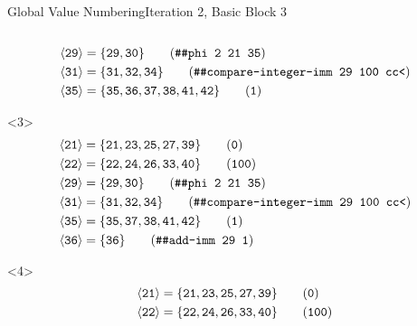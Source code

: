 \documentclass{beamer}
\newcommand{\vn}[1]{\ensuremath{\langle\texttt{#1}\rangle}}
\newcommand{\vreg}[1]{\texttt{#1}}
\begin{document}
\begin{frame}[fragile]{Global Value Numbering}{Iteration 2, Basic Block 3}
\begin{columns}[t,onlytextwidth]
\begin{column}{.5\textwidth}
\begin{onlyenv}
\begin{align*}
          \vn{29} &= \{\vreg{29},
                       \vreg{30}\} \tag{\texttt{\#\#phi 2 21 35}} \\
          \vn{31} &= \{\vreg{31},
                       \vreg{32},
                       \vreg{34}\} \tag{\texttt{\#\#compare-integer-imm 29 100 cc<}} \\
          \vn{35} &= \{\vreg{35},
                       \vreg{36},
                       \vreg{37},
                       \vreg{38},
                       \vreg{41},
                       \vreg{42}\} \tag{\texttt{1}}
        \end{align*}
      \end{onlyenv}
      \begin{onlyenv}<3>
        \begin{align*}
          \vn{21} &= \{\vreg{21},
                       \vreg{23},
                       \vreg{25},
                       \vreg{27},
                       \vreg{39}\} \tag{\texttt{0}} \\
          \vn{22} &= \{\vreg{22},
                       \vreg{24},
                       \vreg{26},
                       \vreg{33},
                       \vreg{40}\} \tag{\texttt{100}} \\
          \vn{29} &= \{\vreg{29},
                       \vreg{30}\} \tag{\texttt{\#\#phi 2 21 35}} \\
          \vn{31} &= \{\vreg{31},
                       \vreg{32},
                       \vreg{34}\} \tag{\texttt{\#\#compare-integer-imm 29 100 cc<}} \\
          \vn{35} &= \{\vreg{35},
                       \vreg{37},
                       \vreg{38},
                       \vreg{41},
                       \vreg{42}\} \tag{\texttt{1}} \\
          \vn{36} &= \{\vreg{36}\} \tag{\texttt{\#\#add-imm 29 1}}
        \end{align*}
      \end{onlyenv}
      \begin{onlyenv}<4>
        \begin{align*}
          \vn{21} &= \{\vreg{21},
                       \vreg{23},
                       \vreg{25},
                       \vreg{27},
                       \vreg{39}\} \tag{\texttt{0}} \\
          \vn{22} &= \{\vreg{22},
                       \vreg{24},
                       \vreg{26},
                       \vreg{33},
                       \vreg{40}\} \tag{\texttt{100}} \\

\end{align*}
\end{onlyenv}
\end{column}
\end{columns}
\end{frame}
\end{document}
